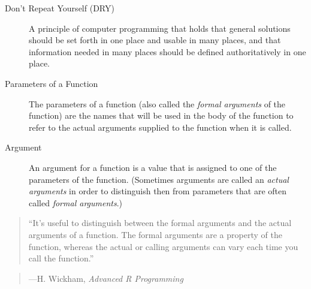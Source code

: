 \documentclass[]{book}
\theoremstyle{definition}
\theoremstyle{definition}
\theoremstyle{remark}
\begin{document}
{\begin{description}
\item[Don't Repeat Yourself (DRY) ]
A principle of computer programming that holds that general solutions
should be set forth in one place and usable in many places, and that
information needed in many places should be defined authoritatively in
one place.
\item[Parameters of a Function ]
The parameters of a function (also called the \emph{formal arguments} of
the function) are the names that will be used in the body of the
function to refer to the actual arguments supplied to the function when
it is called.
\item[Argument ]
An argument for a function is a value that is assigned to one of the
parameters of the function. (Sometimes arguments are called an
\emph{actual arguments} in order to distinguish then from parameters
that are often called \emph{formal arguments}.)
\end{description}

\begin{quote}
``It's useful to distinguish between the formal arguments and the actual
arguments of a function. The formal arguments are a property of the
function, whereas the actual or calling arguments can vary each time you
call the function.''
\end{quote}

\begin{quote}
---H. Wickham, \emph{Advanced R Programming}
\end{quote}

}
\end{document}
